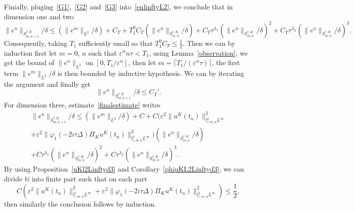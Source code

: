 \documentclass[10pt,a4paper]{article}
\begin{document}
  Finially, pluging~\eqref{G1},~\eqref{G2} and~\eqref{G3} into~\eqref{enlinftyL2}, we conclude that
  in dimension one and two
  \begin{equation}\label{finalestimate}
    \|e^n\|_{S^{\tau,K}_{m,n+1}}/\delta \leq (\|e^m\|_{L^2}/\delta) + C_T + T_1^\eta C_T (\|e^n\|_{S^{\tau,K}_{m,n}}/\delta) + 
    C_T \tau^{\lambda_1} (\|e^n\|_{S^{\tau,K}_{m,n}}/\delta)^2 + 
    C_T \tau^{\lambda_2}(\|e^n\|_{S^{\tau,K}_{m,n}}/\delta)^3.
  \end{equation}
  Consequently, taking \(T_1\) sufficiently small so that \(T_1^\eta C_T \leq
  \frac12 \). Then we can by induction first let \(m=0\), \(n\) such that
  \(\varepsilon^\alpha n \tau < T_1\), using Lemma~\ref{observation}, we get the
  bound of \(\|e^n\|_{L^2}\) on \([0,T_1/\varepsilon^\alpha]\), then let
  \(m=\lceil T_1/(\varepsilon^\alpha \tau)\rceil\), the first term \(\|e^m\|_{L^2}/\delta\) is
  then bounded by inductive hypothesis. We can by iterating the argument and
  finally get 
  \[ \|e^n\|_{S^{\tau,K}_{m,n+1}}/\delta \leq C_T'. \]
  For dimension three, estimate~\eqref{finalestimate} writes 
  \begin{multline}
    \|e^n\|_{S^{\tau,K}_{m,n+1}}/\delta \leq (\|e^m\|_{L^2}/\delta) + C + 
    C (\varepsilon^2 \|u^K(t_n)\|_{l^2_{\tau,m,n}L^\infty}^2 \\ +
    \varepsilon^2 
    \|\varphi_1(-2i\tau\Delta)\Pi_K u^K(t_n)\|_{l^2_{\tau,m,n}L^\infty}^2  ) 
    (\|e^n\|_{S^{\tau,K}_{m,n}}/\delta) \\  + 
    C \tau^{\lambda_1} (\|e^n\|_{S^{\tau,K}_{m,n}}/\delta)^2 + 
    C \tau^{\lambda_2}(\|e^n\|_{S^{\tau,K}_{m,n}}/\delta)^3.
  \end{multline}
  By using Proposition~\ref{uKl2Linftyd3} and Corollary~\ref{phiuKL2Linftyd3}, 
  we can divide \(\mathbb{N}\) into finite part such that on each part
  \[C (\varepsilon^2 \|u^K(t_n)\|_{l^2_{\tau,m,n}L^\infty}^2 + \varepsilon^2 
  \|\varphi_1(-2i\tau\Delta)\Pi_K u^K(t_n)\|_{l^2_{\tau,m,n}L^\infty}^2) \leq
  \frac12,\] 
  then similarly the conclusion follows by induction.
\end{document}
